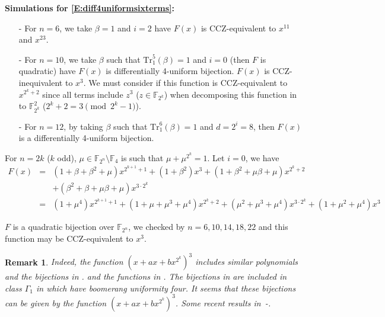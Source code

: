 \documentclass[12pt,a4paper]{ctexbook}
\newcommand{\0}{\textbf{0}}
\newcommand{\1}{\textbf{1}}
\newcommand{\F}{\mathbb{F}}
\newtheorem{remark}{Remark}
\begin{document}
    \textbf{Simulations for \eqref{E:diff4uniformsixterms}:}
    \begin{enumerate}
      \item [-] For $n=6$, we take $\beta=1$ and $i=2$ have $F(x)$ is CCZ-equivalent to $x^{11}$ and $x^{23}$.
      \item [-] For $n=10$, we take $\beta$ such that $\mathrm{Tr}_1^5(\beta)=1$ and $i=0$ (then $F$ is quadratic) have $F(x)$ is
    differentially 4-uniform bijection. $F(x)$ is CCZ-inequivalent to $x^{3}$.
    {\color{red}We must consider if this function is CCZ-equivalent to $x^{2^k+2}$ since all terms include $z^3$ ($z\in\F_{2^k}$) when decomposing this
    function in to $\F_{2^k}^2$ ($2^k+2=3 \pmod {2^k-1}$).}
      \item [-] For $n=12$, by taking $\beta$ such that $\mathrm{Tr}_1^6(\beta)=1$ and $d=2^i=8$, then $F(x)$ is a differentially 4-uniform bijection.
    \end{enumerate}
    
    \vspace{5mm}
    
    For $n=2k$ ($k$ odd), $\mu\in\F_{2^n}\setminus \F_4$ is such that $\mu+\mu^{2^k}=1$.
    Let $i=0$, we have
    \begin{eqnarray}\label{E:diff4uniformQuadratic}
    F(x)&=&(1+\beta+\beta^2+\mu) x^{2^{k+1}+1}+(1+\beta^2) x^{3}+(1+\beta^2+\mu\beta+\mu) x^{2^k+2}\nonumber\\
    &&+(\beta^2+\beta+\mu\beta+\mu) x^{3\cdot 2^k}\nonumber\\
    &=&(1+\mu^4) x^{2^{k+1}+1}+(1+\mu+\mu^3+\mu^4) x^{2^k+2}+(\mu^2+\mu^3+\mu^4) x^{3\cdot 2^k}+(1+\mu^2+\mu^4) x^3\nonumber
    \end{eqnarray}
    
    $F$ is a quadratic bijection over $\F_{2^n}$, we checked by $n=6,10,14,18,22$ and this function may be CCZ-equivalent to $x^{3}$.
    \begin{remark}\label{R:TuPermutation}
    {\color{red}Indeed, the function $(x+ax+bx^{2^k})^3$ includes similar polynomials and the bijections in \cite{TuFFA19,TuFFA18}. and the functions in \cite{TuBCTIT20}.
    The bijections in \cite[Theorem 1-(2)]{TuFFA18} are included in class $\Gamma_1$ in \cite{TuBCTIT20} which have boomerang uniformity four.
    It seems that these bijections can be given by the function $(x+ax+bx^{2^k})^3$.
    Some recent results in~\cite{QuButterflyDCC21,KimTypeCCDS21}-\cite{NoteButterflyDCC2022}.
    }
    \end{remark}
\end{document}
